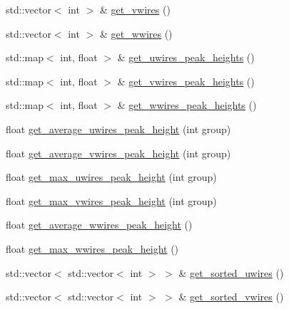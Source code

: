 \begin{DoxyCompactItemize}
\item 
std\+::vector$<$ int $>$ \& \hyperlink{class_wire_cell_1_1_sig_proc_1_1_p_m_t_noise_r_o_i_a388a75bac2d59d83ee61b7f33e8757a2}{get\+\_\+vwires} ()
\item 
std\+::vector$<$ int $>$ \& \hyperlink{class_wire_cell_1_1_sig_proc_1_1_p_m_t_noise_r_o_i_a37bf42499b39970780687fe960df6006}{get\+\_\+wwires} ()
\item 
std\+::map$<$ int, float $>$ \& \hyperlink{class_wire_cell_1_1_sig_proc_1_1_p_m_t_noise_r_o_i_a6810688bbdacd8489d7641a231f25c72}{get\+\_\+uwires\+\_\+peak\+\_\+heights} ()
\item 
std\+::map$<$ int, float $>$ \& \hyperlink{class_wire_cell_1_1_sig_proc_1_1_p_m_t_noise_r_o_i_a85ce56dcca5e91eb335e8c12b984bc4d}{get\+\_\+vwires\+\_\+peak\+\_\+heights} ()
\item 
std\+::map$<$ int, float $>$ \& \hyperlink{class_wire_cell_1_1_sig_proc_1_1_p_m_t_noise_r_o_i_ac801578d1580a4d8eb0ba98b20f2191a}{get\+\_\+wwires\+\_\+peak\+\_\+heights} ()
\item 
float \hyperlink{class_wire_cell_1_1_sig_proc_1_1_p_m_t_noise_r_o_i_a3a991d86acfa1be6a8070ac516a624c9}{get\+\_\+average\+\_\+uwires\+\_\+peak\+\_\+height} (int group)
\item 
float \hyperlink{class_wire_cell_1_1_sig_proc_1_1_p_m_t_noise_r_o_i_aeff495991c25c4ff4091eb839835e230}{get\+\_\+average\+\_\+vwires\+\_\+peak\+\_\+height} (int group)
\item 
float \hyperlink{class_wire_cell_1_1_sig_proc_1_1_p_m_t_noise_r_o_i_a44c13f88197acd2204d17bc2b9b75f3e}{get\+\_\+max\+\_\+uwires\+\_\+peak\+\_\+height} (int group)
\item 
float \hyperlink{class_wire_cell_1_1_sig_proc_1_1_p_m_t_noise_r_o_i_a5c9e02b024551af28776257cfb336f45}{get\+\_\+max\+\_\+vwires\+\_\+peak\+\_\+height} (int group)
\item 
float \hyperlink{class_wire_cell_1_1_sig_proc_1_1_p_m_t_noise_r_o_i_a89da1079a85e1cfa87962daefc2d0266}{get\+\_\+average\+\_\+wwires\+\_\+peak\+\_\+height} ()
\item 
float \hyperlink{class_wire_cell_1_1_sig_proc_1_1_p_m_t_noise_r_o_i_a9239f0b7d6fa6d9bb1c12129e7d34352}{get\+\_\+max\+\_\+wwires\+\_\+peak\+\_\+height} ()
\item 
std\+::vector$<$ std\+::vector$<$ int $>$ $>$ \& \hyperlink{class_wire_cell_1_1_sig_proc_1_1_p_m_t_noise_r_o_i_ad037eeda9c0e6e50ad4a57d731cb8f56}{get\+\_\+sorted\+\_\+uwires} ()
\item 
std\+::vector$<$ std\+::vector$<$ int $>$ $>$ \& \hyperlink{class_wire_cell_1_1_sig_proc_1_1_p_m_t_noise_r_o_i_a72a080e71cf66af837197e4aa1ca8060}{get\+\_\+sorted\+\_\+vwires} ()

\end{DoxyCompactItemize}
